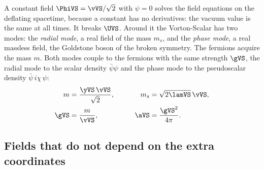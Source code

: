 A constant field $\PhiVS=\vVS/\sqrt2$ with $\psi=0$ solves the field equations on the deflating
spacetime, because a constant has no derivatives: the vacuum value is the same at all times. It
breaks $\UVS$. Around it the Vorton-Scalar has two modes: the \emph{radial mode}, a real field of the
mass $m_s$, and the \emph{phase mode}, a real massless field, the Goldstone boson of the broken
symmetry. The fermions acquire the mass $m$. Both modes couple to the fermions with the same strength
$\gVS$, the radial mode to the scalar density $\bar\psi\psi$ and the phase mode to the pseudoscalar
density $\bar\psi\,i\chi\,\psi$:
\begin{equation}
\begin{aligned}
m&=\frac{\yVS\,\vVS}{\sqrt2},&\qquad m_s&=\sqrt{2\lamVS}\,\vVS,\\
\gVS&=\frac{m}{\vVS},&\qquad\aVS&=\frac{\gVS^{2}}{4\pi}.
\end{aligned}
\label{eq:masses}
\end{equation}

\subsection{Fields that do not depend on the extra coordinates}

